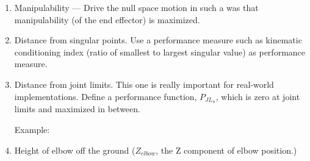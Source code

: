 \begin{enumerate}
\item Manipulability --- Drive the null space motion in such a was that manipulability
(of the end effector) is maximized.

\item Distance from singular points.  Use a performance measure such as kinematic
conditioning index (ratio of smallest to largest singular value) as performance
measure.

\item Distance from joint limits.  This one is really important for real-world
implementations.  Define a performance function, $P_{JL_n}$,
which is zero at joint limits and maximized in between.

Example:

\item Height of elbow off the ground ($Z_{elbow}$, the Z component of elbow position.)



\end{enumerate}
